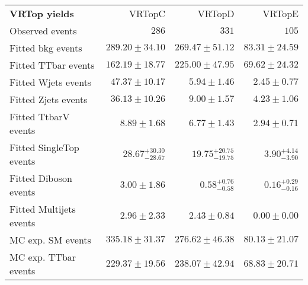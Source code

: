 

\begin{table}
\begin{center}
\setlength{\tabcolsep}{0.0pc}
{\small
\begin{tabular*}{\textwidth}{@{\extracolsep{\fill}}lrrr}
\noalign{\smallskip}\hline\noalign{\smallskip}
{\bf VRTop yields}           & VRTopC            & VRTopD            & VRTopE              \\[-0.05cm]
\noalign{\smallskip}\hline\noalign{\smallskip}
Observed events          & $286$              & $331$              & $105$                    \\
\noalign{\smallskip}\hline\noalign{\smallskip}
Fitted bkg events         & $289.20 \pm 34.10$          & $269.47 \pm 51.12$          & $83.31 \pm 24.59$              \\
\noalign{\smallskip}\hline\noalign{\smallskip}
        Fitted TTbar events         & $162.19 \pm 18.77$          & $225.00 \pm 47.95$          & $69.62 \pm 24.32$              \\
        Fitted Wjets events         & $47.37 \pm 10.17$          & $5.94 \pm 1.46$          & $2.45 \pm 0.77$              \\
        Fitted Zjets events         & $36.13 \pm 10.26$          & $9.00 \pm 1.57$          & $4.23 \pm 1.06$              \\
        Fitted TtbarV events         & $8.89 \pm 1.68$          & $6.77 \pm 1.43$          & $2.94 \pm 0.71$              \\
        Fitted SingleTop events         & $28.67_{-28.67}^{+30.30}$          & $19.75_{-19.75}^{+20.75}$          & $3.90_{-3.90}^{+4.14}$              \\
        Fitted Diboson events         & $3.00 \pm 1.86$          & $0.58_{-0.58}^{+0.76}$          & $0.16_{-0.16}^{+0.29}$              \\
        Fitted Multijets events         & $2.96 \pm 2.33$          & $2.43 \pm 0.84$          & $0.00 \pm 0.00$              \\
 \noalign{\smallskip}\hline\noalign{\smallskip}
MC exp. SM events              & $335.18 \pm 31.37$          & $276.62 \pm 46.38$          & $80.13 \pm 21.07$              \\
\noalign{\smallskip}\hline\noalign{\smallskip}
        MC exp. TTbar events         & $229.37 \pm 19.56$          & $238.07 \pm 42.94$          & $68.83 \pm 20.71$              \\

\end{tabular*}}
\end{center}
\end{table}
